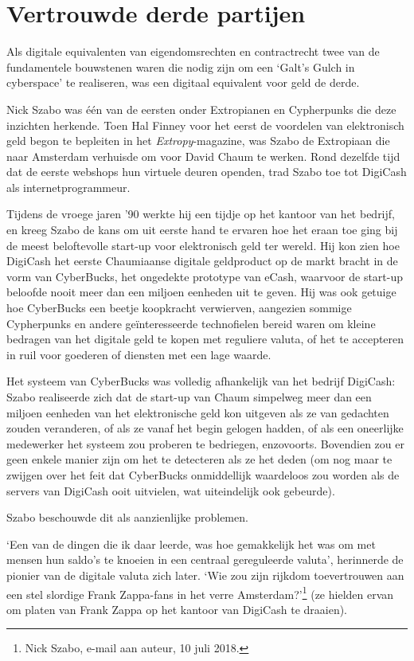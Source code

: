 \documentclass[smalldemyvopaper,11pt,twoside,onecolumn,openright,extrafontsizes,hidelinks]{memoir}
\begin{document}
\section{Vertrouwde derde partijen}\label{vertrouwde-derde-partijen}

Als digitale equivalenten van eigendomsrechten en contractrecht twee van
de fundamentele bouwstenen waren die nodig zijn om een `Galt's Gulch in
cyberspace' te realiseren, was een digitaal equivalent voor geld de
derde.

Nick Szabo was één van de eersten onder Extropianen en Cypherpunks die
deze inzichten herkende. Toen Hal Finney voor het eerst de voordelen van
elektronisch geld begon te bepleiten in het \emph{Extropy}-magazine, was
Szabo de Extropiaan die naar Amsterdam verhuisde om voor David Chaum te
werken. Rond dezelfde tijd dat de eerste webshops hun virtuele deuren
openden, trad Szabo toe tot DigiCash als internetprogrammeur.

Tijdens de vroege jaren '90 werkte hij een tijdje op het kantoor van het
bedrijf, en kreeg Szabo de kans om uit eerste hand te ervaren hoe het
eraan toe ging bij de meest beloftevolle start-up voor elektronisch geld
ter wereld. Hij kon zien hoe DigiCash het eerste Chaumiaanse digitale
geldproduct op de markt bracht in de vorm van CyberBucks, het ongedekte
prototype van eCash, waarvoor de start-up beloofde nooit meer dan een
miljoen eenheden uit te geven. Hij was ook getuige hoe CyberBucks een
beetje koopkracht verwierven, aangezien sommige Cypherpunks en andere
geïnteresseerde technofielen bereid waren om kleine bedragen van het
digitale geld te kopen met reguliere valuta, of het te accepteren in
ruil voor goederen of diensten met een lage waarde.

Het systeem van CyberBucks was volledig afhankelijk van het bedrijf
DigiCash: Szabo realiseerde zich dat de start-up van Chaum simpelweg
meer dan een miljoen eenheden van het elektronische geld kon uitgeven
als ze van gedachten zouden veranderen, of als ze vanaf het begin
gelogen hadden, of als een oneerlijke medewerker het systeem zou
proberen te bedriegen, enzovoorts. Bovendien zou er geen enkele manier
zijn om het te detecteren als ze het deden (om nog maar te zwijgen over
het feit dat CyberBucks onmiddellijk waardeloos zou worden als de
servers van DigiCash ooit uitvielen, wat uiteindelijk ook gebeurde).

Szabo beschouwde dit als aanzienlijke problemen.

`Een van de dingen die ik daar leerde, was hoe gemakkelijk het was om
met mensen hun saldo's te knoeien in een centraal gereguleerde valuta',
herinnerde de pionier van de digitale valuta zich later. `Wie zou zijn
rijkdom toevertrouwen aan een stel slordige Frank Zappa-fans in het
verre Amsterdam?'\footnote{Nick Szabo, e-mail aan auteur, 10 juli 2018.}
(ze hielden ervan om platen van Frank Zappa op het kantoor van DigiCash
te draaien).
\end{document}
